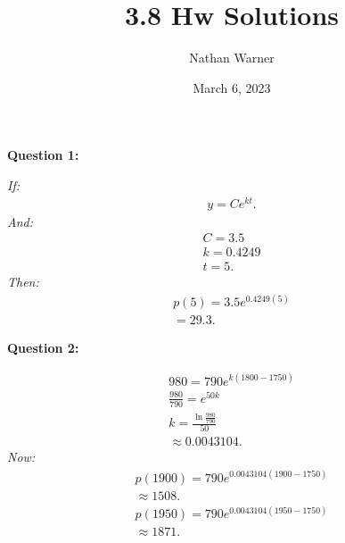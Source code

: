 \documentclass{report}
\title{\Huge{3.8 Hw Solutions}}
\author{\huge{Nathan Warner}}
\date{\huge{March 6, 2023}}
\begin{document}
    \maketitle
    \begin{Large}
        \noindent \textbf{Question 1:}
    \end{Large}
    \bigbreak \noindent 
    \bigbreak \noindent 
    \textit{If:}
    \begin{align*}
        y = Ce^{kt}
    .\end{align*}
    \textit{And:}
    \begin{align*}
        C = 3.5 \\
        k = 0.4249 \\
        t = 5
    .\end{align*}
    \bigbreak \noindent 
    \textit{Then:}
    \begin{align*}
        p(5) = 3.5e^{0.4249(5)} \\
        = 29.3
    .\end{align*}
    \bigbreak \noindent 

    \bigbreak \noindent \bigbreak \noindent 
    \begin{Large}
        \textbf{Question 2:}
    \end{Large}
    \bigbreak \noindent 
    \bigbreak \noindent 
    \begin{align*}
        980 = 790e^{k(1800-1750)} \\
        \frac{980}{790} = e^{50k} \\
        k = \frac{\ln{\frac{980}{790}}}{50} \\
        \approx 0.0043104
    .\end{align*}
    \bigbreak \noindent 
    \textit{Now:}
    \begin{align*}
        p(1900) = 790e^{0.0043104(1900-1750)} \\
        \approx 1508 
    .\end{align*}
    \begin{align*}
        p(1950) = 790e^{0.0043104(1950-1750)} \\
        \approx 1871
    .\end{align*}
\end{document}
